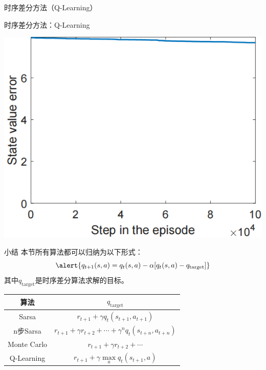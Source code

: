 \begin{section}{时序差分方法\alert{（Q-Learning）}}
\begin{frame}{时序差分方法：Q-Learning}
\begin{center}
\begin{minipage}{0.2\textwidth}
        \end{minipage}
        \hspace{1cm}
        \begin{minipage}{0.2\textwidth}
            \centering
            \includegraphics[width=\linewidth]{assets/e0.1statevalueerror2.jpg}
        \end{minipage}
    \end{center}
\end{frame}

\begin{frame}{小结}
    本节所有算法都可以归纳为以下形式：
    \[
        \alert{q_{t+1}(s,a)=q_t(s,a)-\alpha[q_t(s,a)-q_{\text{target}}]}
    \]
    其中$q_{\text{target}}$是时序差分算法求解的目标。
    \begin{table}[]
        \begin{tabular}{@{}cc@{}}
        \toprule
        算法    & $q_{\text{target}}$\\ \midrule
        Sarsa &  $r_{t+1}+\gamma q_t(s_{t+1}, a_{t+1})$\\
        n步Sarsa & $r_{t+1}+\gamma r_{t+2} + \cdots + \gamma^nq_t(s_{t+n},a_{t+n})$ \\
        Monte Carlo &  $r_{t+1}+\gamma r_{t+2} + \cdots$\\
        Q-Learning &  $r_{t+1}+\gamma \underset{a}{\max}q_t(s_{t+1}, a)$\\
        \bottomrule
        \end{tabular}
    \end{table}
\end{frame}


\end{section}
